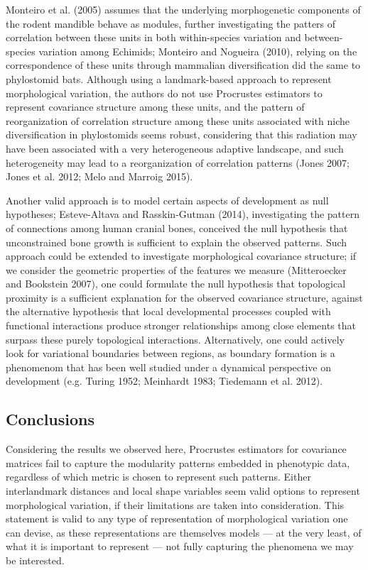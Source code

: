 \documentclass[12pt,]{article}
\begin{document}
Monteiro et al. (2005) assumes that the underlying morphogenetic
components of the rodent mandible behave as modules, further
investigating the patters of correlation between these units in both
within-species variation and between-species variation among Echimids;
Monteiro and Nogueira (2010), relying on the correspondence of these
units through mammalian diversification did the same to phylostomid
bats. Although using a landmark-based approach to represent
morphological variation, the authors do not use Procrustes estimators to
represent covariance structure among these units, and the pattern of
reorganization of correlation structure among these units associated
with niche diversification in phylostomids seems robust, considering
that this radiation may have been associated with a very heterogeneous
adaptive landscape, and such heterogeneity may lead to a reorganization
of correlation patterns (Jones 2007; Jones et al. 2012; Melo and Marroig
2015).

Another valid approach is to model certain aspects of development as
null hypotheses; Esteve-Altava and Rasskin-Gutman (2014), investigating
the pattern of connections among human cranial bones, conceived the null
hypothesis that unconstrained bone growth is sufficient to explain the
observed patterns. Such approach could be extended to investigate
morphological covariance structure; if we consider the geometric
properties of the features we measure (Mitteroecker and Bookstein 2007),
one could formulate the null hypothesis that topological proximity is a
sufficient explanation for the observed covariance structure, against
the alternative hypothesis that local developmental processes coupled
with functional interactions produce stronger relationships among close
elements that surpass these purely topological interactions.
Alternatively, one could actively look for variational boundaries
between regions, as boundary formation is a phenomenom that has been
well studied under a dynamical perspective on development (e.g. Turing
1952; Meinhardt 1983; Tiedemann et al. 2012).

\subsection{Conclusions}\label{conclusions}

Considering the results we observed here, Procrustes estimators for
covariance matrices fail to capture the modularity patterns embedded in
phenotypic data, regardless of which metric is chosen to represent such
patterns. Either interlandmark distances and local shape variables seem
valid options to represent morphological variation, if their limitations
are taken into consideration. This statement is valid to any type of
representation of morphological variation one can devise, as these
representations are themselves models --- at the very least, of what it
is important to represent --- not fully capturing the phenomena we may
be interested.
\end{document}
